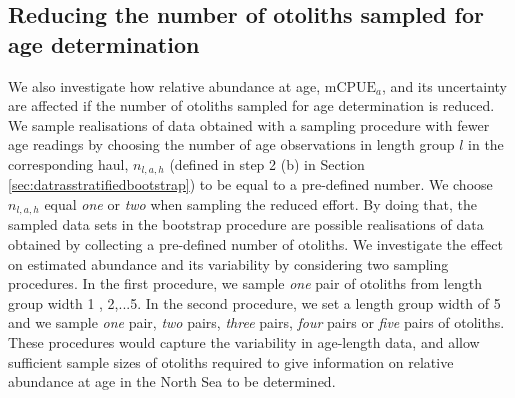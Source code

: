 \documentclass[a4paper 12pt]{article}
\numberwithin{equation}{section}
\begin{document}
\subsection{Reducing the number of otoliths sampled for age determination}
\label{sec:reducingeffort}
We also investigate how relative abundance at age, $\text{mCPUE}_a$, and its uncertainty are affected if the  number of otoliths sampled for age determination is reduced. We sample realisations of data obtained with a sampling procedure with fewer age readings by choosing the number of age observations in length group $l$ in the corresponding haul,  $n_{l,a,h}$ (defined in step 2 (b) in Section \ref{sec:datrasstratifiedbootstrap}) to be equal to a pre-defined number. We choose $n_{l,a,h}$ equal \textit{one} or \textit{two} when sampling the reduced effort. By doing that, the sampled data sets in the bootstrap procedure are possible realisations of data obtained by collecting a pre-defined number of otoliths. We investigate the effect on estimated abundance and its variability by considering two sampling procedures. In the first procedure, we sample \textit{one} pair of otoliths from length group width 1 , 2,...5. In the second procedure, we set a length group width of 5 and we sample \textit{one} pair, \textit{two} pairs, \textit{three} pairs, \textit{four} pairs or \textit{five} pairs of otoliths. These procedures would capture the variability in age-length data, and allow sufficient sample sizes of otoliths required to give information on relative abundance at age in the North Sea to be determined. 
\clearpage
\end{document}
